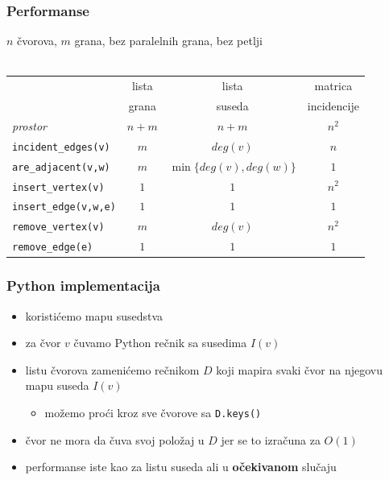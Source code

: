 \documentclass[compress]{beamer}
\begin{document}
\begin{frame}[fragile]
  \frametitle{Performanse}
    $n$ čvorova, $m$ grana, bez paralelnih grana, bez petlji \\ \ \\
  \begin{tabular}{l|c|c|c}
     & lista & lista & matrica \\
     & grana & suseda & incidencije \\ \hline     
    \textit{prostor} & $n+m$ & $n+m$ & $n^2$ \\ \hline
    \texttt{incident\_edges(v)} & $m$ & $deg(v)$ & $n$ \\ \hline
    \texttt{are\_adjacent(v,w)} & $m$ & $\min\{deg(v),deg(w)\}$ & $1$ \\ \hline
    \texttt{insert\_vertex(v)} & $1$ & $1$ & $n^2$ \\ \hline
    \texttt{insert\_edge(v,w,e)} & $1$ & $1$ & $1$ \\ \hline
    \texttt{remove\_vertex(v)} & $m$ & $deg(v)$ & $n^2$ \\ \hline
    \texttt{remove\_edge(e)} & $1$ & $1$ & $1$ \\
  \end{tabular}
\end{frame}

\begin{frame}[fragile]
  \frametitle{Python implementacija}
  \begin{itemize}
    \item koristićemo mapu susedstva
    \item za čvor $v$ čuvamo Python rečnik sa susedima $I(v)$
    \item listu čvorova zamenićemo rečnikom $D$ koji mapira svaki čvor 
      na njegovu mapu suseda $I(v)$
    \begin{itemize}
      \item možemo proći kroz sve čvorove sa \texttt{D.keys()}
    \end{itemize}
    \item čvor ne mora da čuva svoj položaj u $D$ jer se to izračuna za 
      $O(1)$
    \item performanse iste kao za listu suseda ali u \textbf{očekivanom}
      slučaju
  \end{itemize}
\end{frame}
\end{document}
